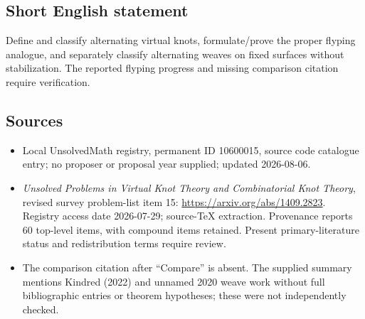 \documentclass[11pt]{article}
\begin{document}
\subsection{Short English statement}
Define and classify alternating virtual knots, formulate/prove the proper flyping analogue, and separately classify alternating weaves on fixed surfaces without stabilization. The reported flyping progress and missing comparison citation require verification.
\subsection{Sources}
\begin{itemize}
\item Local UnsolvedMath registry, permanent ID 10600015, source code catalogue entry; no proposer or proposal year supplied; updated 2026-08-06.
\item \emph{Unsolved Problems in Virtual Knot Theory and Combinatorial Knot Theory}, revised survey problem-list item 15: \url{https://arxiv.org/abs/1409.2823}. Registry access date 2026-07-29; source-TeX extraction. Provenance reports 60 top-level items, with compound items retained. Present primary-literature status and redistribution terms require review.
\item The comparison citation after ``Compare'' is absent. The supplied summary mentions Kindred (2022) and unnamed 2020 weave work without full bibliographic entries or theorem hypotheses; these were not independently checked.
\end{itemize}
\end{document}
